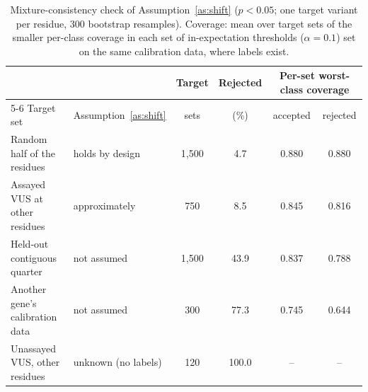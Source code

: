\begin{table}[ht]
\centering
\caption{Mixture-consistency check of Assumption~\ref{as:shift} ($p<0.05$; one target variant per residue, 300
bootstrap resamples). Coverage: mean over target sets of the smaller per-class coverage in each set of in-expectation
thresholds ($\alpha=0.1$) set on the same calibration data, where labels exist.}\label{tab:app_mixture}
\setlength{\tabcolsep}{4pt}
\begin{tabular}{llcccc}
\toprule
 & & Target & Rejected & \multicolumn{2}{c}{Per-set worst-class coverage}\\
\cmidrule(lr){5-6}
Target set & Assumption~\ref{as:shift} & sets & (\%) & accepted & rejected\\
\midrule
Random half of the residues & holds by design & 1,500 & 4.7 & 0.880 & 0.880 \\
Assayed VUS at other residues & approximately & 750 & 8.5 & 0.845 & 0.816 \\
Held-out contiguous quarter & not assumed & 1,500 & 43.9 & 0.837 & 0.788 \\
Another gene's calibration data & not assumed & 300 & 77.3 & 0.745 & 0.644 \\
Unassayed VUS, other residues & unknown (no labels) & 120 & 100.0 & -- & -- \\
\bottomrule
\end{tabular}
\end{table}
